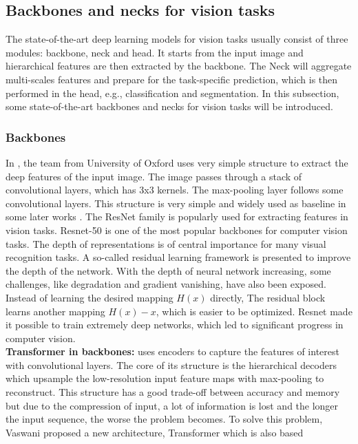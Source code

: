 \subsection{Backbones and necks for vision tasks}
    The state-of-the-art deep learning models for vision tasks usually consist of three modules: backbone, neck and head\cite{Bouraya2021}. It starts from the input image and hierarchical 
    features are then extracted by the backbone. The Neck will aggregate multi-scales features and prepare for the task-specific prediction, which is then performed in the head, e.g., 
    classification and segmentation. In this subsection, some state-of-the-art backbones and necks for vision tasks will be introduced.
\subsubsection{Backbones}
    In \cite{simonyan2015a}, the team from University of Oxford uses very simple structure to extract the deep features of the input image. The image passes through a stack of convolutional 
    layers, which has 3x3 kernels. The max-pooling layer follows some convolutional layers. This structure is very simple and widely used as baseline in some later works\cite{guan2019deep}
    \cite{tammina2019transfer}. The ResNet family is popularly used for extracting features in vision tasks. Resnet-50\cite{7485869} is one of the most popular backbones for computer vision 
    tasks. The depth of representations is of central importance for many visual recognition tasks. A so-called residual learning framework is presented to improve the depth of the network.
    With the depth of neural network increasing, some challenges, like degradation and gradient vanishing, have also been exposed. Instead of learning the desired mapping $H(x)$ directly, 
    The residual block learns another mapping $H(x) - x$, which is easier to be optimized. Resnet made it possible to train extremely deep networks, which led to significant progress in 
    computer vision.\\
    \textbf{Transformer in backbones: }\cite{7803544} uses encoders to capture the features of interest with convolutional layers. The core of its structure is the hierarchical decoders 
    which upsample the low-resolution input feature maps with max-pooling to reconstruct. This structure has a good trade-off between accuracy and memory but due to the compression of input, 
    a lot of information is lost and the longer the input sequence, the worse the problem becomes. To solve this problem, Vaswani proposed a new architecture, Transformer which is also based 
